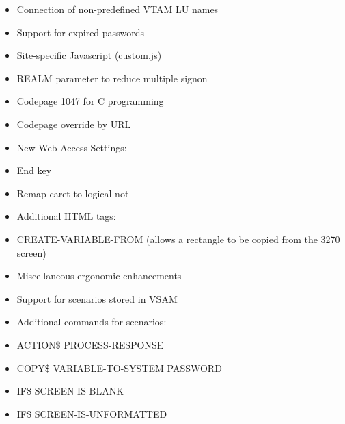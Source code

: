 \documentclass[letterpaper,10pt,english]{sphinxmanual}
\begin{document}
\begin{itemize}
\item {} 
Connection of non-predefined VTAM LU names

\item {} 
Support for expired passwords

\item {} 
Site-specific Javascript (custom.js)

\item {} 
REALM parameter to reduce multiple signon

\item {} 
Codepage 1047 for C programming

\item {} 
Codepage override by URL

\item {} 
New Web Access Settings:

\item {} 
End key

\item {} 
Remap caret to logical not

\item {} 
Additional HTML tags:

\item {} 
CREATE-VARIABLE-FROM (allows a rectangle to be copied from the 3270 screen)

\item {} 
Miscellaneous ergonomic enhancements

\end{itemize}

\begin{itemize}
\item {} 
Support for scenarios stored in VSAM

\item {} 
Additional commands for scenarios:

\item {} 
ACTION\$ PROCESS-RESPONSE

\item {} 
COPY\$ VARIABLE-TO-SYSTEM PASSWORD

\item {} 
IF\$ SCREEN-IS-BLANK

\item {} 
IF\$ SCREEN-IS-UNFORMATTED

\end{itemize}
\end{document}
